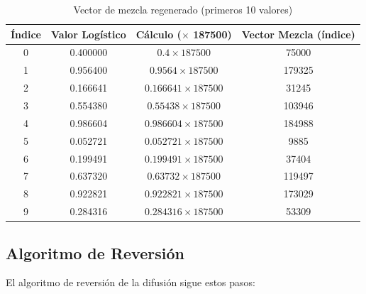 \documentclass[12pt,a4paper]{article}
\begin{document}
	\begin{table}[H]
		\centering
		\caption{Vector de mezcla regenerado (primeros 10 valores)}
		\label{tab:mixing_esclavo}
		\begin{tabular}{@{}cccc@{}}
			\toprule
			\textbf{Índice} & \textbf{Valor Logístico} & \textbf{Cálculo ($\times$ 187500)} & \textbf{Vector Mezcla (índice)} \\ \midrule
			0 & 0.400000 & $0.4 \times 187500$ & 75000 \\
			1 & 0.956400 & $0.9564 \times 187500$ & 179325 \\
			2 & 0.166641 & $0.166641 \times 187500$ & 31245 \\
			3 & 0.554380 & $0.55438 \times 187500$ & 103946 \\
			4 & 0.986604 & $0.986604 \times 187500$ & 184988 \\
			5 & 0.052721 & $0.052721 \times 187500$ & 9885 \\
			6 & 0.199491 & $0.199491 \times 187500$ & 37404 \\
			7 & 0.637320 & $0.63732 \times 187500$ & 119497 \\
			8 & 0.922821 & $0.922821 \times 187500$ & 173029 \\
			9 & 0.284316 & $0.284316 \times 187500$ & 53309 \\ \bottomrule
		\end{tabular}
	\end{table}
	
	\subsection{Algoritmo de Reversión}
	
	El algoritmo de reversión de la difusión sigue estos pasos:
	
\end{document}
